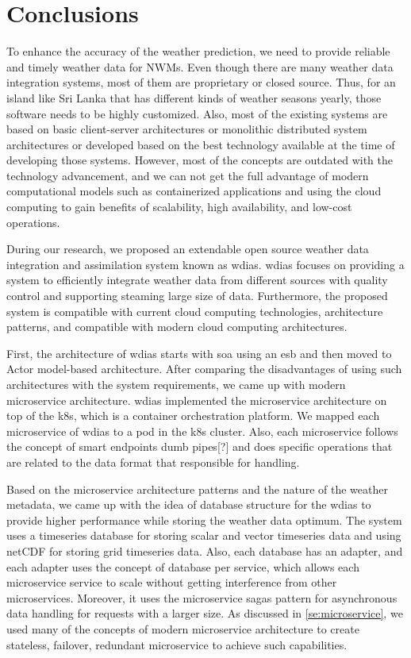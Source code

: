 \section{Conclusions}
\label{se:summary_conclusion}

To enhance the accuracy of the weather prediction, we need to provide reliable and timely weather data for NWMs. Even though there are many weather data integration systems, most of them are proprietary or closed source. Thus, for an island like Sri Lanka that has different kinds of weather seasons yearly, those software needs to be highly customized. Also, most of the existing systems are based on basic client-server architectures or monolithic distributed system architectures or developed based on the best technology available at the time of developing those systems. However, most of the concepts are outdated with the technology advancement, and we can not get the full advantage of modern computational models such as containerized applications and using the cloud computing to gain benefits of scalability, high availability, and low-cost operations.

During our research, we proposed an extendable open source weather data integration and assimilation system known as \acrshort{wdias}. \acrshort{wdias} focuses on providing a system to efficiently integrate weather data from different sources with quality control and supporting steaming large size of data. Furthermore, the proposed system is compatible with current cloud computing technologies, architecture patterns, and compatible with modern cloud computing architectures.

First, the architecture of \acrshort{wdias} starts with \acrshort{soa} using an \acrfull{esb} and then moved to Actor model-based architecture. After comparing the disadvantages of using such architectures with the system requirements, we came up with modern microservice architecture. \acrshort{wdias} implemented the microservice architecture on top of the \acrshort{k8s}, which is a container orchestration platform. We mapped each microservice of \acrshort{wdias} to a pod in the \acrshort{k8s} cluster. Also, each microservice follows the concept of smart endpoints dumb pipes[?] and does specific operations that are related to the data format that responsible for handling.

Based on the microservice architecture patterns and the nature of the weather metadata, we came up with the idea of database structure for the \acrshort{wdias} to provide higher performance while storing the weather data optimum. The system uses a timeseries database for storing scalar and vector timeseries data and using netCDF for storing grid timeseries data. Also, each database has an adapter, and each adapter uses the concept of database per service, which allows each microservice service to scale without getting interference from other microservices.
Moreover, it uses the microservice sagas pattern for asynchronous data handling for requests with a larger size. As discussed in \cref{se:microservice}, we used many of the concepts of modern microservice architecture to create stateless, failover, redundant microservice to achieve such capabilities.


